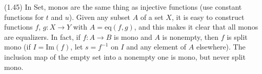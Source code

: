 (1.45) In Set, monos are the same thing as injective functions (use constant functions for $t$ and $u$). Given any subset $A$ of a set $X$, it is easy to construct functions $f$, $g:X \longrightarrow Y$ with $A = \text{eq}(f,g)$, and this makes it clear that all monos are equalizers. In fact, if $f:A \longrightarrow B$ is mono and $A$ is nonempty, then $f$ is split mono (if $I = \text{Im}(f)$, let $s = f^{-1}$ on $I$ and any element of $A$ elsewhere). The inclusion map of the empty set into a nonempty one is mono, but never split mono.